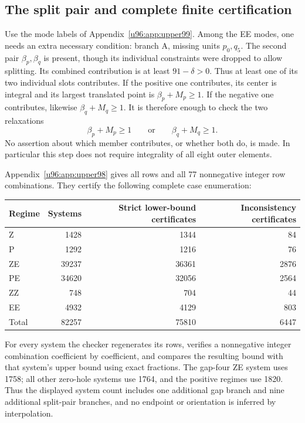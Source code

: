 \documentclass[11pt,a4paper]{article}
\theoremstyle{remark}
\begin{document}
\subsection{The split pair and complete finite certification}
Use the mode labels of Appendix~\ref{u96:app:upper99}. Among the EE modes,
one needs an extra necessary condition: branch A, missing units
$p_0,q_5$. The second pair $\beta_p,\beta_q$ is present, though its
individual constraints were dropped to allow splitting.
Its combined contribution is at least $91-\delta>0$.
Thus at least one of its two individual slots contributes. If the positive
one contributes, its center is integral and its largest translated point
is $\beta_p+M_p\geq1$. If the negative one contributes, likewise
$\beta_q+M_q\geq1$. It is therefore enough to check the two relaxations
\begin{equation}
 \beta_p+M_p\geq1\qquad\text{or}\qquad
 \beta_q+M_q\geq1.
 \label{u96:eq:98-split}
\end{equation}
No assertion about which member contributes, or whether both do, is made.
In particular this step does not require integrality of all eight outer
elements.

Appendix~\ref{u96:app:upper98} gives all rows and all 77 nonnegative integer
row combinations. They certify the following complete case enumeration:
\begin{center}\small
\begin{tabular}{lrrr}
\toprule
Regime&Systems&Strict lower-bound certificates&Inconsistency certificates\\
\midrule
Z&1428&1344&84\\
P&1292&1216&76\\
ZE&39237&36361&2876\\
PE&34620&32056&2564\\
ZZ&748&704&44\\
EE&4932&4129&803\\
\midrule
Total&82257&75810&6447\\
\bottomrule
\end{tabular}
\end{center}
For every system the checker regenerates its rows, verifies a nonnegative
integer combination coefficient by coefficient, and compares the resulting
bound with that system's upper bound using exact fractions. The gap-four
ZE system uses 1758; all other zero-hole systems use 1764, and the positive
regimes use 1820. Thus the displayed system count includes one additional
gap branch and nine additional split-pair branches, and no endpoint or
orientation is inferred by interpolation.
\end{document}
